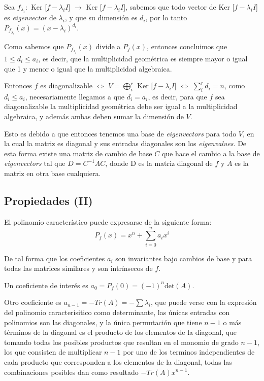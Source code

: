 \documentclass{preset}
\begin{document}
Sea $f_{\lambda_i}:$ Ker [$f-\lambda_i I$] $\rightarrow$ Ker [$f-\lambda_i I$], sabemos que todo vector de Ker [$f-\lambda_i I$] es \textit{eigenvector} de $\lambda_i$, y que su dimensión es $d_i$, por lo tanto $P_{f_{\lambda_i}}(x)=(x-\lambda_i)^{d_i}$.

Como sabemos que $P_{f_{\lambda_i}}(x)$ divide a $P_f(x)$, entonces concluimos que $1 \leq d_i \leq a_i$, es decir, que la multiplicidad geométrica es siempre mayor o igual que 1 y menor o igual que la multiplicidad algebraica.

Entonces $f$ es diagonalizable $\iff$ $V=\bigoplus^r_i$ Ker [$f-\lambda_i I$] $\iff$ $\sum^r_i d_i = n$, como $d_i \leq a_i$, necesariamente llegamos a que $d_i=a_i$, es decir, para que $f$ sea diagonalizable la multiplicidad geométrica debe ser igual a la multiplicidad algebraica, y además ambas deben sumar la dimensión de $V$.

Esto es debido a que entonces tenemos una base de \textit{eigenvectors} para todo $V$, en la cual la matriz es diagonal y sus entradas diagonales son los \textit{eigenvalues}. De esta forma existe una matriz de cambio de base $C$ que hace el cambio a la base de \textit{eigenvectors} tal que $D=C^{-1} A C$, donde D es la matriz diagonal de $f$ y $A$ es la matriz en otra base cualquiera.

\vspace{-15pt}
\subsection{Propiedades (II)}

El polinomio característico puede expresarse de la siguiente forma:
\[P_f(x)=x^n +\sum_{i=0}^n {a_i x^i}\]

De tal forma que los coeficientes $a_i$ son invariantes bajo cambios de base y para todas las matrices similares y son intrínsecos de $f$.

Un coeficiente de interés es $a_0=P_f(0)=(-1)^n \mbox{det}(A)$.

Otro coeficiente es $a_{n-1}=-Tr(A)=-\sum \lambda_i$, que puede verse con la expresión del polinomio caracterísitico como determinante, las únicas entradas con polinomios son las diagonales, y la única permutación que tiene $n-1$ o más términos de la diagonal es el producto de los elementos de la diagonal, que tomando todas los posibles productos que resultan en el monomio de grado $n-1$, los que consisten de multiplicar $n-1$ por uno de los terminos independientes de cada producto que corresponden a los elementos de la diagonal, todas las combinaciones posibles dan como resultado $-Tr(A) x^{n-1}$.
\end{document}
